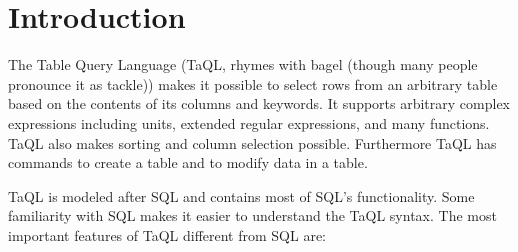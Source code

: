 

\section{Introduction}
The Table Query Language (TaQL, rhymes with bagel (though many people
pronounce it as tackle)) makes it possible to select
rows from an arbitrary table based on the contents of its
columns and keywords. It supports arbitrary complex
expressions including units, extended regular expressions, and many functions.
TaQL also makes sorting and column selection possible.
Furthermore TaQL has commands to create a table and to modify data
in a table.

TaQL is modeled after SQL and contains most of SQL's
functionality. Some familiarity with SQL makes it easier to understand
the TaQL syntax.
The most important features of TaQL different from SQL are:
